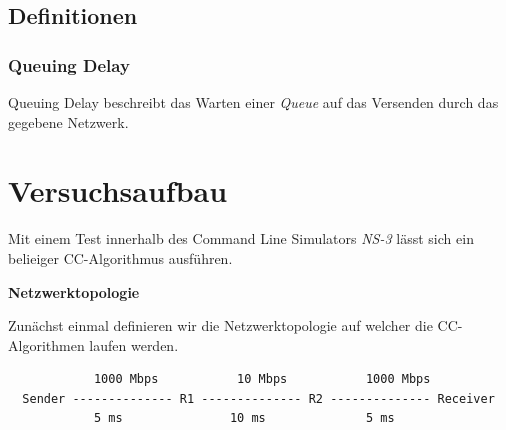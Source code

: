 \documentclass[paper=a4,fontsize=12pt,ngerman]{scrartcl}
\begin{document}
\subsection{Definitionen}

\subsubsection{Queuing Delay}
Queuing Delay beschreibt das Warten einer \textit{Queue}
auf das Versenden durch das gegebene Netzwerk.


\section{Versuchsaufbau}

Mit einem Test innerhalb des Command Line Simulators \textit{NS-3} lässt sich ein belieiger 
CC-Algorithmus ausführen.


\textbf{Netzwerktopologie}

Zunächst einmal definieren wir die Netzwerktopologie auf welcher die CC-Algorithmen
laufen werden.
\small
\begin{verbatim}
            1000 Mbps           10 Mbps           1000 Mbps
  Sender -------------- R1 -------------- R2 -------------- Receiver
            5 ms               10 ms              5 ms
\end{verbatim}
\end{document}
